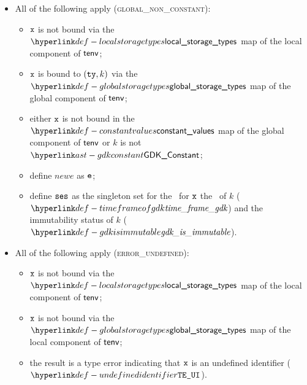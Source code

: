 \begin{itemize}
\begin{itemize}
    \item All of the following apply (\textsc{global\_non\_constant}):
    \begin{itemize}
      \item $\vx$ is not bound via the $\localstoragetypes$ map of the local component of $\tenv$;
      \item $\vx$ is bound to $(\tty, k)$ via the $\globalstoragetypes$ map of the global component of $\tenv$;
      \item either $\vx$ is not bound in the $\constantvalues$ map of the global component of $\tenv$ or $k$ is not $\GDKConstant$;
      \item define $newe$ as $\ve$;
      \item define $\vses$ as the singleton set for the \ReadGlobalTerm\ for $\vx$ the \timeframeterm\ of
            $k$ ($\timeframeofgdk$) and the immutability status of $k$ ($\gdkisimmutable$).
    \end{itemize}

    \item All of the following apply (\textsc{error\_undefined}):
    \begin{itemize}
      \item $\vx$ is not bound via the $\localstoragetypes$ map of the local component of $\tenv$;
      \item $\vx$ is not bound via the $\globalstoragetypes$ map of the local component of $\tenv$;
      \item the result is a type error indicating that $\vx$ is an undefined identifier ($\UndefinedIdentifier$).
    \end{itemize}
  \end{itemize}
\end{itemize}

\FormallyParagraph
\begin{mathpar}
\end{mathpar}

\begin{mathpar}
\end{mathpar}

